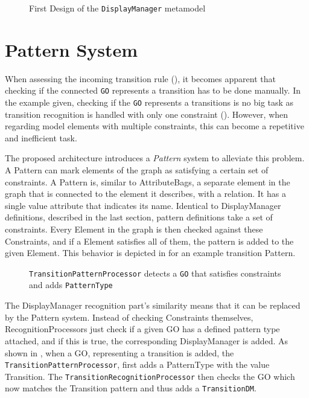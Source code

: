 \begin{figure}
  \centering
  
  \caption{First Design of the \texttt{DisplayManager} metamodel}
  \label{fig:initial-syntax-model}
\end{figure}


\section{Pattern System}
When assessing the incoming transition rule (), it becomes apparent that checking if the connected \texttt{GO} represents a transition has to be done manually. In the example given, checking if the \texttt{GO} represents a transitions is no big task as transition recognition is handled with only one constraint (). However, when regarding model elements with multiple constraints, this can become a repetitive and inefficient task.

The proposed architecture introduces a \emph{Pattern} system to alleviate this problem. A Pattern can mark elements of the graph as satisfying a certain set of constraints. A Pattern is, similar to AttributeBags, a separate element in the graph that is connected to the element it describes, with a relation. It has a single value attribute that indicates its name. Identical to DisplayManager definitions, described in the last section, pattern definitions take a set of constraints. Every Element in the graph is then checked against these Constraints, and if a Element satisfies all of them, the pattern is added to the given Element. This behavior is depicted in  for an example transition Pattern.

\begin{figure}
  \centering
  
  \caption{\texttt{TransitionPatternProcessor} detects a \texttt{GO} that satisfies constraints and adds \texttt{PatternType}}
  \label{fig:kind-recognition}
\end{figure}

The DisplayManager recognition part's similarity means that it can be replaced by the Pattern system. Instead of checking Constraints themselves, RecognitionProcessors just check if a given GO has a defined pattern type attached, and if this is true, the corresponding DisplayManager is added. As shown in , when a GO, representing a transition is added, the \texttt{TransitionPatternProcessor}, first adds a PatternType with the value Transition. The \texttt{TransitionRecognitionProcessor} then checks the GO which now matches the Transition pattern and thus adds a \texttt{TransitionDM}.

